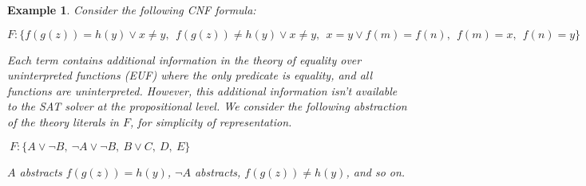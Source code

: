 \documentclass[11pt]{article}
\newtheorem{example}{Example}[section]
\begin{document}
	\begin{example}
	\label{ex:trans}
		\em Consider the following 
		CNF formula:
		\begin{center}
			$ F: \{f(g(z)) = h(y) \lor 
			x \neq y,\ \ f(g(z)) \neq 
			h(y) \lor x \neq y,\ \ 
			x = y \lor f(m) = f(n),\ \ 
			f(m) = x,\ \ f(n) = y\}$
		\end{center}
		Each term contains additional 
		information in the theory 
		of equality over uninterpreted 
		functions (EUF) where the only 
		predicate is equality, and all
		functions are uninterpreted. 
		However, this additional 
		information isn't available to 
		the SAT solver at the 
		propositional level. We consider 
		the following abstraction 
		of the theory literals in $F$, 
		for simplicity of representation. 
		\begin{center}
			$\ F: \{A \lor \neg B,\ 
			\neg A \lor 
			\neg B,\ B \lor C,\ D,\ 
			E\}$
		\end{center}
		$A$ abstracts $f(g(z)) = h(y)$,
		$\neg A$ abstracts, $f(g(z))
		\neq h(y)$,
		and so on.
	

\end{example}
\end{document}
